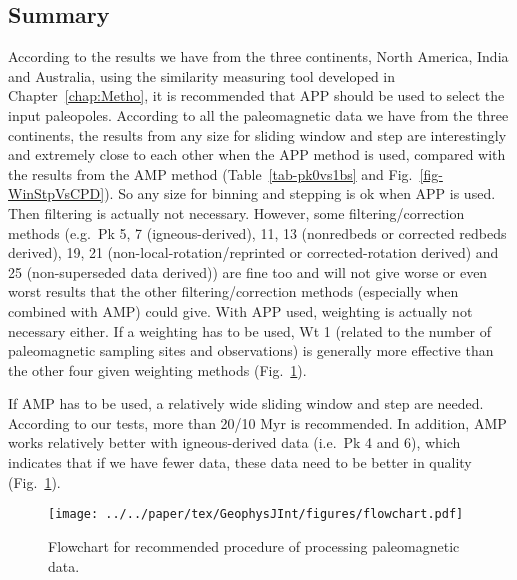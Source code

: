 \subsection{Summary}

According to the results we have from the three continents, North America, India
and Australia, using the similarity measuring tool developed in
Chapter~\ref{chap:Metho}, it is recommended that APP should be used to select
the input paleopoles. According to all the paleomagnetic data we have from the
three continents, the results from any size for sliding window and step are
interestingly and extremely close to each other when the APP method is used,
compared with the results from the AMP method (Table~\ref{tab-pk0vs1bs} and
Fig.~\ref{fig-WinStpVsCPD}). So any size for binning and stepping is ok when APP
is used. Then filtering is actually not necessary. However, some
filtering/correction methods (e.g.\ Pk 5, 7 (igneous-derived), 11, 13
(nonredbeds or corrected redbeds derived), 19, 21 (non-local-rotation/reprinted
or corrected-rotation derived) and 25 (non-superseded data derived)) are fine
too and will not give worse or even worst results that the other
filtering/correction methods (especially when combined with AMP) could give.
With APP used, weighting is actually not necessary either. If a weighting has to
be used, Wt 1 (related to the number of paleomagnetic sampling sites and
observations) is generally more effective than the other four given weighting
methods (Fig.~\ref{fig-flow}).

If AMP has to be used, a relatively wide sliding window and step are needed.
According to our tests, more than 20/10 Myr is recommended. In addition, AMP
works relatively better with igneous-derived data (i.e.\ Pk 4 and 6), which
indicates that if we have fewer data, these data need to be better in quality
(Fig.~\ref{fig-flow}).

\begin{figure}
  \centering
  \texttt{[image: ../../paper/tex/GeophysJInt/figures/flowchart.pdf]}
  \caption[Flowchart of making a reliable paleomagnetic APWP]{Flowchart for
    recommended procedure of processing paleomagnetic data.}\label{fig-flow}
\end{figure}
